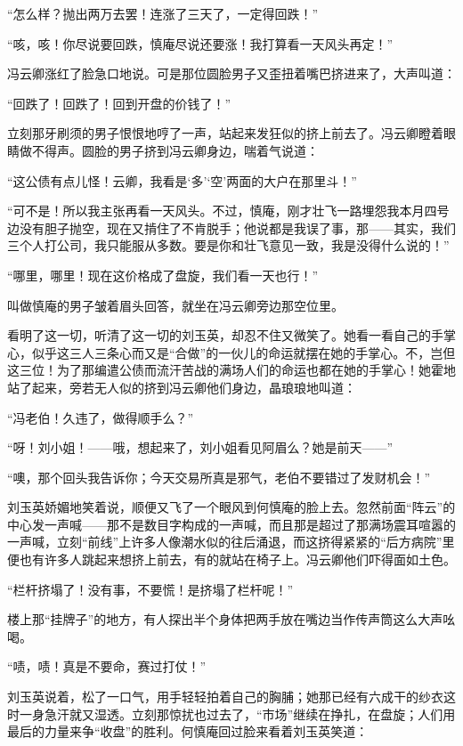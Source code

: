 \par “怎么样？抛出两万去罢！连涨了三天了，一定得回跌！”
\par “咳，咳！你尽说要回跌，慎庵尽说还要涨！我打算看一天风头再定！”
\par 冯云卿涨红了脸急口地说。可是那位圆脸男子又歪扭着嘴巴挤进来了，大声叫道：
\par “回跌了！回跌了！回到开盘的价钱了！”
\par 立刻那牙刷须的男子恨恨地哼了一声，站起来发狂似的挤上前去了。冯云卿瞪着眼睛做不得声。圆脸的男子挤到冯云卿身边，喘着气说道：
\par “这公债有点儿怪！云卿，我看是‘多’‘空’两面的大户在那里斗！”
\par “可不是！所以我主张再看一天风头。不过，慎庵，刚才壮飞一路埋怨我本月四号边没有胆子抛空，现在又掯住了不肯脱手；他说都是我误了事，那——其实，我们三个人打公司，我只能服从多数。要是你和壮飞意见一致，我是没得什么说的！”
\par “哪里，哪里！现在这价格成了盘旋，我们看一天也行！”
\par 叫做慎庵的男子皱着眉头回答，就坐在冯云卿旁边那空位里。
\par 看明了这一切，听清了这一切的刘玉英，却忍不住又微笑了。她看一看自己的手掌心，似乎这三人三条心而又是“合做”的一伙儿的命运就摆在她的手掌心。不，岂但这三位！为了那编遣公债而流汗苦战的满场人们的命运也都在她的手掌心！她霍地站了起来，旁若无人似的挤到冯云卿他们身边，晶琅琅地叫道：
\par “冯老伯！久违了，做得顺手么？”
\par “呀！刘小姐！——哦，想起来了，刘小姐看见阿眉么？她是前天——”
\par “噢，那个回头我告诉你；今天交易所真是邪气，老伯不要错过了发财机会！”
\par 刘玉英娇媚地笑着说，顺便又飞了一个眼风到何慎庵的脸上去。忽然前面“阵云”的中心发一声喊——那不是数目字构成的一声喊，而且那是超过了那满场震耳喧嚣的一声喊，立刻“前线”上许多人像潮水似的往后涌退，而这挤得紧紧的“后方病院”里便也有许多人跳起来想挤上前去，有的就站在椅子上。冯云卿他们吓得面如土色。
\par “栏杆挤塌了！没有事，不要慌！是挤塌了栏杆呢！”
\par 楼上那“挂牌子”的地方，有人探出半个身体把两手放在嘴边当作传声筒这么大声吆喝。
\par “啧，啧！真是不要命，赛过打仗！”
\par 刘玉英说着，松了一口气，用手轻轻拍着自己的胸脯；她那已经有六成干的纱衣这时一身急汗就又湿透。立刻那惊扰也过去了，“市场”继续在挣扎，在盘旋；人们用最后的力量来争“收盘”的胜利。何慎庵回过脸来看着刘玉英笑道：
